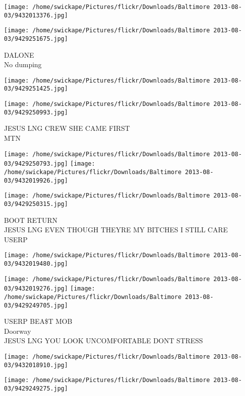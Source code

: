 \documentclass[10pt,letterpaper]{article}
\begin{document}
\texttt{[image: /home/swickape/Pictures/flickr/Downloads/Baltimore 2013-08-03/9432013376.jpg]}

\vspace{0.25in}
\texttt{[image: /home/swickape/Pictures/flickr/Downloads/Baltimore 2013-08-03/9429251675.jpg]}

DALONE\\
No dumping
\pagebreak

\texttt{[image: /home/swickape/Pictures/flickr/Downloads/Baltimore 2013-08-03/9429251425.jpg]}

\vspace{0.25in}
\texttt{[image: /home/swickape/Pictures/flickr/Downloads/Baltimore 2013-08-03/9429250993.jpg]}

JESUS LNG CREW SHE CAME FIRST\\
MTN
\pagebreak

\texttt{[image: /home/swickape/Pictures/flickr/Downloads/Baltimore 2013-08-03/9429250793.jpg]}
\texttt{[image: /home/swickape/Pictures/flickr/Downloads/Baltimore 2013-08-03/9432019926.jpg]}

\vspace{0.25in}
\texttt{[image: /home/swickape/Pictures/flickr/Downloads/Baltimore 2013-08-03/9429250315.jpg]}

BOOT RETURN\\
JESUS LNG EVEN THOUGH THEYRE MY BITCHES I STILL CARE\\
USERP
\pagebreak

\texttt{[image: /home/swickape/Pictures/flickr/Downloads/Baltimore 2013-08-03/9432019480.jpg]}

\vspace{0.25in}
\texttt{[image: /home/swickape/Pictures/flickr/Downloads/Baltimore 2013-08-03/9432019276.jpg]}
\texttt{[image: /home/swickape/Pictures/flickr/Downloads/Baltimore 2013-08-03/9429249705.jpg]}

USERP BEA\$T MOB\\
Doorway\\
JESUS LNG YOU LOOK UNCOMFORTABLE DONT STRESS
\pagebreak

\texttt{[image: /home/swickape/Pictures/flickr/Downloads/Baltimore 2013-08-03/9432018910.jpg]}

\vspace{0.25in}
\texttt{[image: /home/swickape/Pictures/flickr/Downloads/Baltimore 2013-08-03/9429249275.jpg]}
\end{document}
